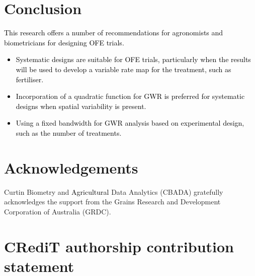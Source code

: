 \documentclass[a4paper]{article} 	%
\newcommand{\zc}[1]{\textcolor{black}{#1}}
\begin{document}
\section{Conclusion}\label{Sec:Conclusion}



\zc{This research offers a number of recommendations for agronomists and biometricians for designing OFE trials.}
\zc{
\begin{itemize}
    \item Systematic designs are suitable for OFE trials, particularly when the results will be used to develop a variable rate map for the treatment, such as fertiliser. 
    \item Incorporation of a quadratic function for GWR is preferred for systematic designs when spatial variability is present.
    \item Using a fixed bandwidth for GWR analysis based on experimental design, such as the number of treatments. 
\end{itemize}
}

\section*{Acknowledgements}

Curtin Biometry and \zc{Agricultural} Data Analytics (CBADA) gratefully acknowledges the support from the Grains Research and Development Corporation of Australia (GRDC).

\section*{CRediT authorship contribution statement}
\end{document}
